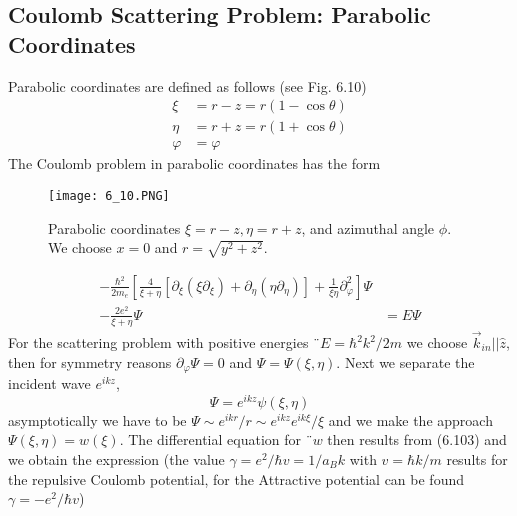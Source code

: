 \subsection{Coulomb Scattering Problem: Parabolic Coordinates}
Parabolic coordinates are defined as follows (see Fig. 6.10)
\begin{equation}
\begin{aligned} \xi &=r-z=r(1-\cos \theta) \\ \eta &=r+z=r(1+\cos \theta) \\ \varphi &=\varphi \end{aligned}
\end{equation}
The Coulomb problem in parabolic coordinates has the form
\begin{figure}[ht]
    \begin{minipage}{0.5\textwidth}
        \centering
        \texttt{[image: 6\_10.PNG]}
    \end{minipage}
    \begin{minipage}{0.5\textwidth}
        \caption{Parabolic coordinates $\xi = r - z, \eta = r + z$, and azimuthal angle $\phi$. We choose $x = 0$     and $r=\sqrt{y^2+z^2}$.}
    \end{minipage}
\end{figure}

\begin{equation}
\begin{aligned}-\frac{\hbar^{2}}{2 m_{e}}\left[\frac{4}{\xi+\eta}\left[\partial_{\xi}\left(\xi \partial_{\xi}\right)+\partial_{\eta}\left(\eta \partial_{\eta}\right)\right]+\frac{1}{\xi \eta} \partial_{\varphi}^{2}\right] \Psi \\-\frac{2 e^{2}}{\xi+\eta} \Psi &=E \Psi \end{aligned}
\end{equation}
For the scattering problem with positive energies $¨E = \hbar^2k^2 / 2m$ we choose $\vec{k}_{in}||\hat{z}$, then for symmetry reasons $\partial_{\varphi}\Psi = 0$ and $\Psi=\Psi(\xi,\eta)$. Next we separate the incident wave $e^{ikz}$,
\begin{equation}
    \Psi=e^{i k z} \psi(\xi, \eta)
    \end{equation}
asymptotically we have to be $\Psi\sim e^{ikr} / r \sim e^{ikz}e^{ik\xi} / \xi$ and we make the approach $\Psi (\xi, \eta) = w (\xi)$. The differential equation for $¨w$ then results from (6.103) and we obtain the expression (the value $\gamma = e^2 /\hbar v= 1 / a_Bk$ with $v = \hbar k / m$ results for the repulsive Coulomb potential, for the Attractive potential can be found $\gamma = -e^2 / \hbar v$)

